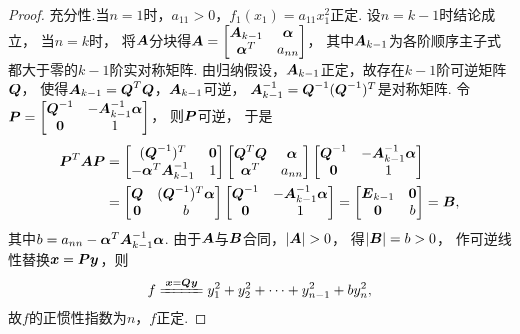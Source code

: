 \begin{theorem}
\begin{proof}
充分性.当\(n=1\)时，\(a_{11} > 0\)，\(f_1(x_1) = a_{11} x_1^2\)正定.
设\(n=k-1\)时结论成立，
当\(n=k\)时，
将\(\boldsymbol{A}\)分块得\(\boldsymbol{A} = \begin{bmatrix}
	\boldsymbol{A}_{k-1} & \boldsymbol\alpha \\
	\boldsymbol\alpha^T & a_{nn}
\end{bmatrix}\)，
其中\(\boldsymbol{A}_{k-1}\)为各阶顺序主子式都大于零的\(k-1\)阶实对称矩阵.
由归纳假设，\(\boldsymbol{A}_{k-1}\)正定，故存在\(k-1\)阶可逆矩阵\(\boldsymbol{Q}\)，
使得\(\boldsymbol{A}_{k-1} = \boldsymbol{Q}^T \boldsymbol{Q}\)，\(\boldsymbol{A}_{k-1}\)可逆，
\(\boldsymbol{A}_{k-1}^{-1} = \boldsymbol{Q}^{-1}(\boldsymbol{Q}^{-1})^T\)是对称矩阵.
令\(\boldsymbol{P} = \begin{bmatrix}
	\boldsymbol{Q}^{-1} & -\boldsymbol{A}_{k-1}^{-1} \boldsymbol\alpha \\
	\boldsymbol0 & 1
\end{bmatrix}\)，
则\(\boldsymbol{P}\)可逆，
于是\begin{align*}
	\boldsymbol{P}^T \boldsymbol{A} \boldsymbol{P} &= \begin{bmatrix}
		(\boldsymbol{Q}^{-1})^T & \boldsymbol0 \\
		-\boldsymbol\alpha^T \boldsymbol{A}_{k-1}^{-1} & 1
	\end{bmatrix}
	\begin{bmatrix}
		\boldsymbol{Q}^T \boldsymbol{Q} & \boldsymbol\alpha \\
		\boldsymbol\alpha^T & a_{nn}
	\end{bmatrix}
	\begin{bmatrix}
		\boldsymbol{Q}^{-1} & -\boldsymbol{A}_{k-1}^{-1} \boldsymbol\alpha \\
		\boldsymbol0 & 1
	\end{bmatrix} \\
	&= \begin{bmatrix}
		\boldsymbol{Q} & (\boldsymbol{Q}^{-1})^T \boldsymbol\alpha \\
		\boldsymbol0 & b
	\end{bmatrix}
	\begin{bmatrix}
		\boldsymbol{Q}^{-1} & -\boldsymbol{A}_{k-1}^{-1} \boldsymbol\alpha \\
		\boldsymbol0 & 1
	\end{bmatrix}
	= \begin{bmatrix}
		\boldsymbol{E}_{k-1} & \boldsymbol0 \\
		\boldsymbol0 & b
	\end{bmatrix} = \boldsymbol{B},
\end{align*}
其中\(b=a_{nn}-\boldsymbol\alpha^T \boldsymbol{A}_{k-1}^{-1} \boldsymbol\alpha\).
由于\(\boldsymbol{A}\)与\(\boldsymbol{B}\)合同，\(\abs{\boldsymbol{A}} > 0\)，
得\(\abs{\boldsymbol{B}} = b > 0\)，
作可逆线性替换\(\boldsymbol{x} = \boldsymbol{P}\boldsymbol{y}\)，则\begin{equation*}
	f \xlongequal{\vb{x}=\vb{Q}\vb{y}} y_1^2 + y_2^2 + \dotsb + y_{n-1}^2 + b y_n^2,
\end{equation*}
故\(f\)的正惯性指数为\(n\)，\(f\)正定.
\end{proof}
\end{theorem}

